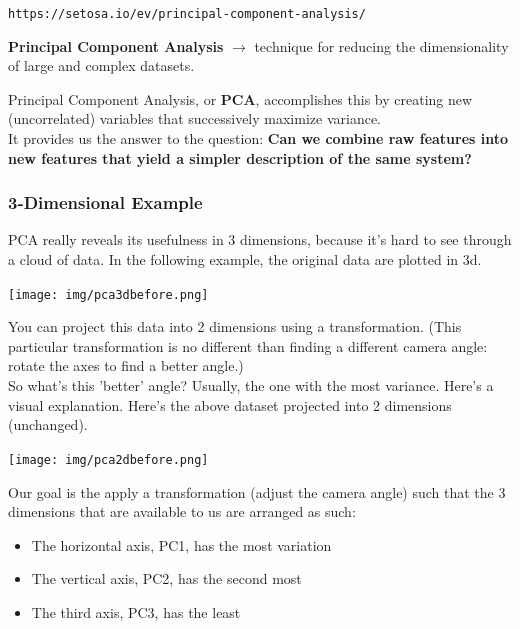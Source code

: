 \documentclass[english, 10pt]{article}
\begin{document}
\texttt{https://setosa.io/ev/principal-component-analysis/}

\hfill \begin{tcolorbox}[title=Definition:,colframe=red!75!black,colback=red!5!white,arc=0pt,fonttitle=\bfseries]
\textbf{Principal Component Analysis} $\rightarrow$ technique for reducing the dimensionality of large and complex datasets.
\end{tcolorbox}

Principal Component Analysis, or \textbf{PCA}, accomplishes this by creating new (uncorrelated) variables that successively maximize variance.\\

It provides us the answer to the question: \textbf{Can we combine raw features into new features that yield a simpler description of the same system?}

\subsubsection{3-Dimensional Example}

PCA really reveals its usefulness in 3 dimensions, because it's hard to see through a cloud of data. In the following example, the original data are plotted in 3d.\\

{
\centering

\texttt{[image: img/pca3dbefore.png]} 

}

\hfill \break You can project this data into 2 dimensions using a transformation. (This particular transformation is no different than finding a different camera angle: rotate the axes to find a better angle.)\\

So what's this 'better' angle? Usually, the one with the most variance. Here's a visual explanation. Here's the above dataset projected into 2 dimensions (unchanged).\\

{
\centering

\texttt{[image: img/pca2dbefore.png]} 

}

Our goal is the apply a transformation (adjust the camera angle) such that the 3 dimensions that are available to us are arranged as such:

\begin{itemize}
	\item The horizontal axis, PC1, has the most variation
	\item The vertical axis, PC2, has the second most
	\item The third axis, PC3, has the least
\end{itemize}
\end{document}
